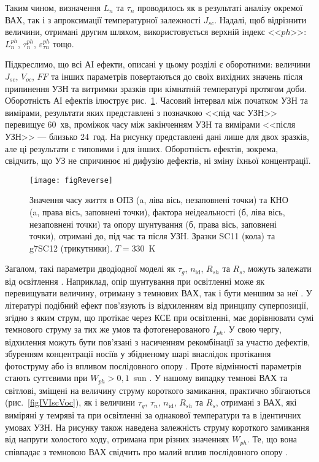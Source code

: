 Таким чином, визначення $L_n$ та $\tau_n$ проводилось як в результаті аналізу окремої ВАХ, так і з апроксимації
температурної залежності $J_{sc}$.
Надалі, щоб відрізнити величини, отримані другим шляхом, використовується верхній індекс <<$ph$>>: $L_n^{ph}$, $\tau_n^{ph}$, $\varepsilon_{\tau n}^{ph}$ тощо.

Підкреслимо, що всі АІ ефекти, описані у цьому розділі є оборотними:
величини $J_{sc}$, $V_{oc}$, $F\!F$ та інших параметрів повертаються до своїх вихідних значень
після припинення УЗН  та витримки зразків при кімнатній температурі протягом доби.
Оборотність АІ ефектів ілюструє рис.~\ref{figReverse}.
Часовий інтервал між початком УЗН та вимірами, результати яких представлені з позначкою <<під час УЗН>>
перевищує 60~хв, проміжок часу між закінченням УЗН та вимірами <<після УЗН>> --- близько 24~год.
На рисунку представлені дані лише для двох зразків, але ці результати є типовими і для інших.
Оборотність ефектів, зокрема, свідчить, що УЗ не спричинює ні дифузію дефектів,
ні зміну їхньої концентрації.

\begin{figure}
\center
\texttt{[image: figReverse]}%
\caption{\label{figReverse}
Значення часу життя в ОПЗ (a, ліва вісь, незаповнені точки)
та КНО (a, права вісь, заповнені точки),
фактора неідеальності (б, ліва вісь, незаповнені точки) та
 опору шунтування (б, права вісь, заповнені точки),
отримані до, під час та після УЗН.
Зразки SC11 (кола) та g7SC12 (трикутники).
$T=330$~K
}%
\end{figure}

Загалом, такі параметри дводіодної моделі як $\tau_g$, $n_{\mathrm{id}}$, $R_{sh}$ та $R_s$, можуть залежати від освітлення \cite{Iph:KHAN2010,Breitenstein2013,SUGIANTO2009}.
Наприклад,  опір шунтування при освітленні може як перевищувати величину, отриману з темнових ВАХ\cite{Iph:KHAN2010}, так і бути меншим за неї \cite{Breitenstein2013,SUGIANTO2009}.
У літературі \cite{Breitenstein2013} подібний ефект пов'язують із відхиленням від принципу суперпозиції,
згідно з яким струм, що протікає через КСЕ при освітленні, має дорівнювати сумі темнового струму за тих же умов та фотогенерованого $I_{ph}$.
У свою чергу, відхилення можуть бути пов'язані з насиченням рекомбінації за участю дефектів,
збуренням концентрації носіїв у збідненому шарі внаслідок протікання фотоструму \cite{Robinson} або із впливом послідовного опору \cite{Rs:BREITENSTEIN2013}.
Проте відмінності параметрів стають суттєвими при $W_{ph}>0,1$~sun
\cite{Breitenstein2013}.
У нашому випадку темнові ВАХ та світлові, зміщені на величину струму короткого замикання, практично збігаються (рис.~\ref{figIVIscVoc}),
як і величини $\tau_g$, $\tau_n$, $n_{\mathrm{id}}$, $R_{sh}$ та $R_s$, отримані з ВАХ, які виміряні у темряві та при освітленні за однакової температури
та в ідентичних умовах УЗН.
На рисунку також наведена залежність струму короткого замикання від напруги холостого ходу, отримана при різних значеннях $W_{ph}$.
Те, що вона співпадає з темновою ВАХ свідчить про малий вплив послідовного опору \cite{Robinson}.

